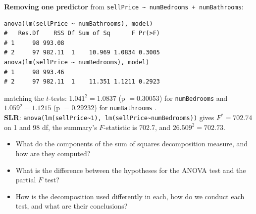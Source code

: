 \begin{example}[$F^*=(t^*)^2$ in the House Pricing Data]
    \textbf{Removing one predictor} from \texttt{sellPrice \textasciitilde{} numBedrooms + numBathrooms}:
\begin{verbatim}
anova(lm(sellPrice ~ numBathrooms), model)
#   Res.Df    RSS Df Sum of Sq      F Pr(>F)
# 1     98 993.08
# 2     97 982.11  1    10.969 1.0834 0.3005
anova(lm(sellPrice ~ numBedrooms), model)
# 1     98 993.46
# 2     97 982.11  1    11.351 1.1211 0.2923
\end{verbatim}
    matching the $t$-tests: $1.041^2=1.0837$ (p $=0.30053$) for \texttt{numBedrooms} and
    $1.059^2=1.1215$ (p $=0.29232$) for \texttt{numBathrooms} .
    \\ \textbf{SLR}: \texttt{anova(lm(sellPrice\textasciitilde1), lm(sellPrice\textasciitilde numBedrooms))}
    gives $F^*=702.74$ on 1 and 98 df, the summary's $F$-statistic is 702.7, and $26.509^2=702.73$.
\end{example}

\begin{remark}
    \begin{itemize}
        \item What do the components of the sum of squares decomposition measure, and how are
        they computed?
        \item What is the difference between the hypotheses for the ANOVA test and the partial $F$ test?
        \item How is the decomposition used differently in each, how do we conduct each test,
        and what are their conclusions?
    \end{itemize}
\end{remark}

